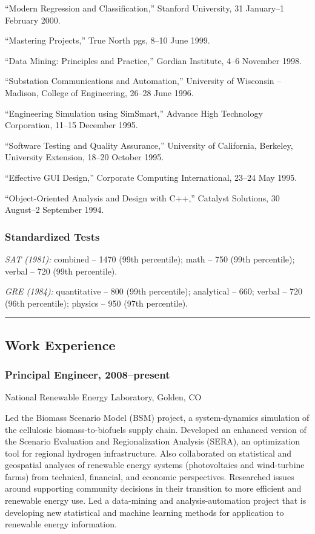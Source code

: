 \documentclass[]{article}
\begin{document}
``Modern Regression and Classification,'' Stanford University, 31
January--1 February 2000.

``Mastering Projects,'' True North pgs, 8--10 June 1999.

``Data Mining: Principles and Practice,'' Gordian Institute, 4--6
November 1998.

``Substation Communications and Automation,'' University of Wisconsin --
Madison, College of Engineering, 26--28 June 1996.

``Engineering Simulation using SimSmart,'' Advance High Technology
Corporation, 11--15 December 1995.

``Software Testing and Quality Assurance,'' University of California,
Berkeley, University Extension, 18--20 October 1995.

``Effective GUI Design,'' Corporate Computing International, 23--24 May
1995.

``Object-Oriented Analysis and Design with C++,'' Catalyst Solutions, 30
August--2 September 1994.

\subsubsection{Standardized Tests}\label{standardized-tests}

\emph{SAT (1981):} combined -- 1470 (99th percentile); math -- 750 (99th
percentile); verbal -- 720 (99th percentile).

\emph{GRE (1984):} quantitative -- 800 (99th percentile); analytical --
660; verbal -- 720 (96th percentile); physics -- 950 (97th percentile).

\begin{center}\rule{3in}{0.4pt}\end{center}

\subsection{Work Experience}\label{work-experience}

\subsubsection{Principal Engineer,
2008--present}\label{principal-engineer-2008present}

National Renewable Energy Laboratory, Golden, CO

Led the Biomass Scenario Model (BSM) project, a system-dynamics
simulation of the cellulosic biomass-to-biofuels supply chain. Developed
an enhanced version of the Scenario Evaluation and Regionalization
Analysis (SERA), an optimization tool for regional hydrogen
infrastructure. Also collaborated on statistical and geospatial analyses
of renewable energy systems (photovoltaics and wind-turbine farms) from
technical, financial, and economic perspectives. Researched issues
around supporting community decisions in their transition to more
efficient and renewable energy use. Led a data-mining and
analysis-automation project that is developing new statistical and
machine learning methods for application to renewable energy
information.
\end{document}

